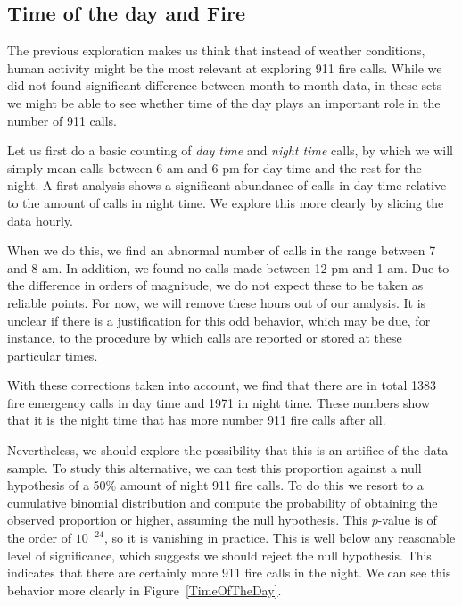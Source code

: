 \documentclass[12pt,a4paper]{article}
\begin{document}
\subsection{Time of the day and Fire}


The previous exploration makes us think that instead of weather conditions, human activity might be the most relevant at exploring 911 fire calls. While we did not found significant difference between month to month data, in these sets we might be able to see whether time of the day plays an important role in the number of 911 calls.

Let us first do a basic counting of \emph{day time} and \emph{night time} calls, by which we will simply mean calls between 6 am and 6 pm for day time and the rest for the night. A first analysis shows a significant abundance of calls in day time relative to the amount of calls in night time. We explore this more clearly by slicing the data hourly.

When we do this, we find an abnormal number of calls in the range between 7 and 8 am. In addition, we found no calls made between 12 pm and 1 am. Due to the difference in orders of magnitude, we do not expect these to be taken as reliable points. For now, we will remove these hours out of our analysis. It is unclear if there is a justification for this odd behavior, which may be due, for instance, to the procedure by which calls are reported or stored at these particular times.

With these corrections taken into account, we find that there are in total 1383 fire emergency calls in day time and 1971 in night time. These numbers show that it is the night time that has more number 911 fire calls after all.

Nevertheless, we should explore the possibility that this is an artifice of the data sample. To study this alternative, we can test this proportion against a null hypothesis of a 50\% amount of night 911 fire calls. To do this we resort to a cumulative binomial distribution and compute the probability of obtaining the observed proportion or higher, assuming the null hypothesis. This $p$-value is of the order of $10^{-24}$, so it is vanishing in practice. This is well below any reasonable level of significance, which suggests we should reject the null hypothesis. This indicates that there are certainly more 911 fire calls in the night. We can see this behavior more clearly in Figure~\ref{TimeOfTheDay}.
\end{document}
